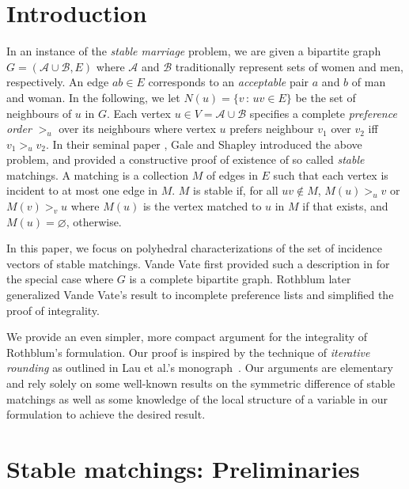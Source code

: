 \documentclass[preprint]{elsarticle}
\newcommand{\cA}{\mathcal{A}} \newcommand{\cB}{\mathcal{B}}
\begin{document}
\section{Introduction}

In an instance of the {\em stable marriage} problem, we are given a
bipartite graph $G=(\cA \cup \cB, E)$ where $\cA$ and $\cB$
traditionally represent sets of women and men, respectively. An edge
$ab \in E$ corresponds to an {\em acceptable} pair $a$ and $b$ of man
and woman. In the following, we let $N(u) = \{ v \,:\, uv \in E \}$ be
the set of neighbours of $u$ in $G$. Each vertex
$u \in V=\cA \cup \cB$ specifies a complete {\em preference order}
$>_u$ over its neighbours where vertex $u$ prefers neighbour $v_1$
over $v_2$ iff $v_1 >_u v_2$.  In their seminal paper
\cite{gale1962college}, Gale and Shapley introduced the above problem,
and provided a constructive proof of existence of so called {\em
  stable} matchings. A matching is a collection $M$ of edges in $E$
such that each vertex is incident to at most one edge in $M$. $M$ is
stable if, for all $uv \not\in M$, $M(u) >_u v$ or $M(v) >_v u$ where
$M(u)$ is the vertex matched to $u$ in $M$ if that exists, and
$M(u)=\varnothing$, otherwise.

In this paper, we focus on polyhedral characterizations of the set of
incidence vectors of stable matchings.  Vande Vate first provided such
a description in \cite{vate1989linear} for the special case where $G$
is a complete bipartite graph.  Rothblum
\cite{rothblum1992characterization} later generalized Vande Vate's
result to incomplete preference lists and simplified the proof of
integrality.

We provide an even simpler, more compact argument for the integrality
of Rothblum's formulation. Our proof is inspired by the technique of
{\em iterative rounding} as outlined in Lau et al.'s
monograph~\cite{lau2011iterative}. Our arguments are elementary and
rely solely on some well-known results on the symmetric difference
of stable matchings as well as some knowledge of the local structure
of a variable in our formulation to achieve the desired result.

\section{Stable matchings: Preliminaries}
\end{document}
